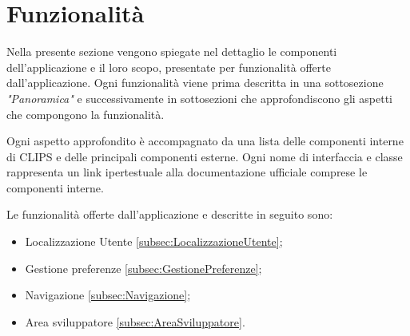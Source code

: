 \documentclass[../ManualeSviluppatore.tex]{subfiles}
\begin{document}
\section{Funzionalità}
	Nella presente sezione vengono spiegate nel dettaglio le componenti dell'applicazione e il loro scopo, presentate per funzionalità offerte dall'applicazione.
	Ogni funzionalità viene prima descritta in una sottosezione \textit{"Panoramica"} e successivamente in sottosezioni che approfondiscono gli aspetti che compongono la funzionalità. 
	
	Ogni aspetto approfondito è accompagnato da una lista delle componenti interne di CLIPS e delle principali componenti esterne. Ogni nome di interfaccia e classe rappresenta un link ipertestuale alla documentazione ufficiale comprese le componenti interne. 
	
	Le funzionalità offerte dall'applicazione e descritte in seguito sono:
	\begin{itemize}
		\item Localizzazione Utente \ref{subsec:LocalizzazioneUtente};
		\item Gestione preferenze \ref{subsec:GestionePreferenze};
		\item Navigazione \ref{subsec:Navigazione};
		\item Area sviluppatore \ref{subsec:AreaSviluppatore}.
	\end{itemize}
	
	\newpage
		
	
	\newpage
		
	
	
	\newpage
		
	
	\newpage
		
\end{document}
